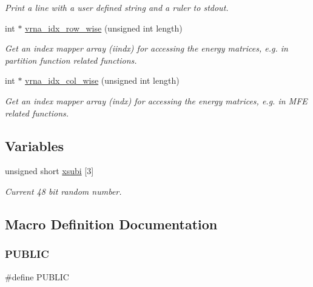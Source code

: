 \begin{DoxyCompactItemize}
\begin{DoxyCompactList}\small\item\em Print a line with a user defined string and a ruler to stdout. \end{DoxyCompactList}\item 
int $\ast$ \mbox{\hyperlink{group__utils_ga70b180e9ea764218a82647a1cd347445}{vrna\+\_\+idx\+\_\+row\+\_\+wise}} (unsigned int length)
\begin{DoxyCompactList}\small\item\em Get an index mapper array (iindx) for accessing the energy matrices, e.\+g. in partition function related functions. \end{DoxyCompactList}\item 
int $\ast$ \mbox{\hyperlink{group__utils_ga89ebc69c52fa0c78c9e1974b0017746b}{vrna\+\_\+idx\+\_\+col\+\_\+wise}} (unsigned int length)
\begin{DoxyCompactList}\small\item\em Get an index mapper array (indx) for accessing the energy matrices, e.\+g. in M\+FE related functions. \end{DoxyCompactList}\end{DoxyCompactItemize}
\subsection*{Variables}
\begin{DoxyCompactItemize}
\item 
unsigned short \mbox{\hyperlink{group__utils_gaf9a866c8417afda7368bbac939ab3c47}{xsubi}} \mbox{[}3\mbox{]}
\begin{DoxyCompactList}\small\item\em Current 48 bit random number. \end{DoxyCompactList}\end{DoxyCompactItemize}


\subsection{Macro Definition Documentation}
\mbox{\label{group__utils_gad17d551e31d1828c68acf40684849b7e}} 
\subsubsection{\texorpdfstring{P\+U\+B\+L\+IC}{PUBLIC}}
{\footnotesize\ttfamily \#define P\+U\+B\+L\+IC}



